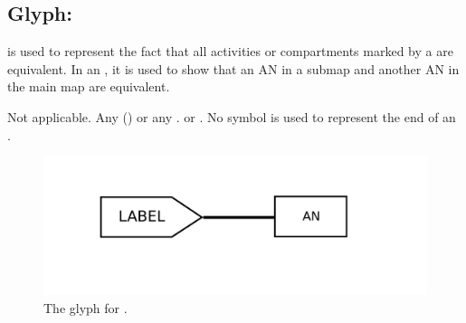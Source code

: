 
\subsection{Glyph:  }\label{sec:equivalenceArc}

 is used to represent the fact that all activities or compartments marked by a  are equivalent. In an \AFm, it is used to show that an AN in a submap and another AN in the main map are equivalent.

\begin{glyphDescription}
 \glyphSboTerm Not applicable.
 \glyphOrigin Any  () or any .
 \glyphTarget {} or .
 \glyphEndPoint No symbol is used to represent the end of an .
 \end{glyphDescription}

\begin{figure}[H]
  \centering
  \includegraphics[scale = 0.4]{images/build/equivalence.pdf}
  \caption{The \AF glyph for .}
  \label{fig:equivalence}
\end{figure}
